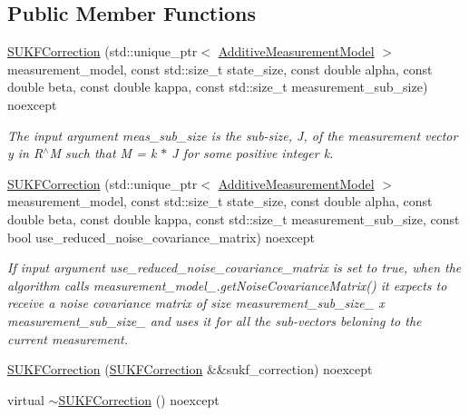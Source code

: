 \subsection*{Public Member Functions}
\begin{DoxyCompactItemize}
\item 
\mbox{\hyperlink{classbfl_1_1SUKFCorrection_aa841c803f97b575565f978f062cea9c1}{S\+U\+K\+F\+Correction}} (std\+::unique\+\_\+ptr$<$ \mbox{\hyperlink{classbfl_1_1AdditiveMeasurementModel}{Additive\+Measurement\+Model}} $>$ measurement\+\_\+model, const std\+::size\+\_\+t state\+\_\+size, const double alpha, const double beta, const double kappa, const std\+::size\+\_\+t measurement\+\_\+sub\+\_\+size) noexcept
\begin{DoxyCompactList}\small\item\em The input argument meas\+\_\+sub\+\_\+size is the sub-\/size, J, of the measurement vector y in R$^\wedge$M such that M = k $\ast$ J for some positive integer k. \end{DoxyCompactList}\item 
\mbox{\hyperlink{classbfl_1_1SUKFCorrection_a9ac13d8bd68f7847b67cc3226907c169}{S\+U\+K\+F\+Correction}} (std\+::unique\+\_\+ptr$<$ \mbox{\hyperlink{classbfl_1_1AdditiveMeasurementModel}{Additive\+Measurement\+Model}} $>$ measurement\+\_\+model, const std\+::size\+\_\+t state\+\_\+size, const double alpha, const double beta, const double kappa, const std\+::size\+\_\+t measurement\+\_\+sub\+\_\+size, const bool use\+\_\+reduced\+\_\+noise\+\_\+covariance\+\_\+matrix) noexcept
\begin{DoxyCompactList}\small\item\em If input argument use\+\_\+reduced\+\_\+noise\+\_\+covariance\+\_\+matrix is set to true, when the algorithm calls measurement\+\_\+model\+\_\+.\+get\+Noise\+Covariance\+Matrix() it expects to receive a noise covariance matrix of size measurement\+\_\+sub\+\_\+size\+\_\+ x measurement\+\_\+sub\+\_\+size\+\_\+ and uses it for all the sub-\/vectors beloning to the current measurement. \end{DoxyCompactList}\item 
\mbox{\hyperlink{classbfl_1_1SUKFCorrection_a74f7500ab29ca256f83993e838047735}{S\+U\+K\+F\+Correction}} (\mbox{\hyperlink{classbfl_1_1SUKFCorrection}{S\+U\+K\+F\+Correction}} \&\&sukf\+\_\+correction) noexcept
\item 
virtual \mbox{\hyperlink{classbfl_1_1SUKFCorrection_acadbfb1ba75c7e1c90c0a480aa1cb0fd}{$\sim$\+S\+U\+K\+F\+Correction}} () noexcept
\item 

\end{DoxyCompactItemize}
